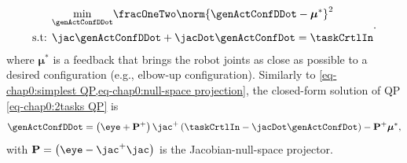 \begin{align}\label{eq-chap0:2tasks QP}
	\begin{split}
		&\underset{\genActConfDDot}{\min}\fracOneTwo \norm{\genActConfDDot-\boldsymbol{\mu}^*}^2 \\ 
		\text{s.t: }&  \jac\genActConfDDot + \jacDot\genActConfDot= \taskCrtlIn
	\end{split}.
\end{align}
where $ \boldsymbol{\mu}^*$ is a feedback that brings the robot joints as close as possible to a desired configuration (e.g., elbow-up configuration). Similarly to  \cref{eq-chap0:simplest QP,eq-chap0:null-space projection}, the closed-form solution of QP \cref{eq-chap0:2tasks QP} is~\cite{siciliano1991icar} 
\begin{equation}\label{eq-chap0:null-space projection 2tasks}
	\genActConfDDot = \left(\eye + \mathbf{P}^{+} \right)\jac^+\left(\taskCrtlIn- \jacDot\genActConfDot\right) - \mathbf{P}^{+} \boldsymbol{\mu}^*,
\end{equation} 
with $\mathbf{P}= \left(\eye - \jac^+\jac\right)$ is the Jacobian-null-space projector.

